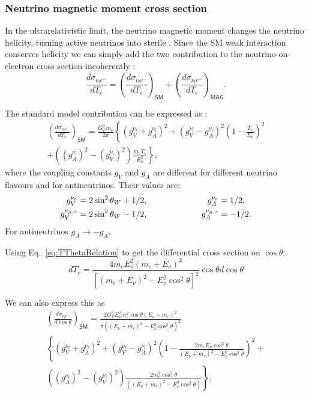 \subsubsection{Neutrino magnetic moment cross section}

In the ultrarelativistic limit, the neutrino magnetic moment changes the neutrino helicity, turning active neutrinos into sterile . Since the SM weak interaction conserves helicity we can simply add the two contribution to the neutrino-on-electron cross section incoherently \cite{nuElmagInt2015.pdf}:
\begin{equation}
\frac{d\sigma_{\nu_le^-}}{dT_e}=\left(\frac{d\sigma_{\nu_le^-}}{dT_e}\right)_{\textsf{SM}}+\left(\frac{d\sigma_{\nu_le^-}}{dT_e}\right)_{\textsf{MAG}}.
\end{equation}

The standard model contribution can be expressed as \cite{nuElmagInt2015.pdf}:
\begin{multline}
\left(\frac{d\sigma_{\nu_le^-}}{dT_e}\right)_{\textsf{SM}}=\frac{G_F^2m_e}{2\pi}\left\lbrace\left(g_V^{\nu_l}+g_A^{\nu_l}\right)^2+\left(g_V^{\nu_l}-g_A^{\nu_l}\right)^2\left(1-\frac{T_e}{E_{\nu}}\right)^2\right.\\
+\left.\left(\left(g_A^{\nu_l}\right)^2-\left(g_V^{\nu_l}\right)^2\right)\frac{m_eT_e}{E_{\nu}^2}\right\rbrace,
\end{multline}
where the coupling constants $g_V$ and $g_A$ are different for different neutrino flavours and for antineutrinos. Their values are:
\begin{align}
g_V^{\nu_e}&=2\sin^2\theta_W+1/2,\hspace{2.5cm} g_A^{\nu_e}=1/2,\\
g_V^{\nu_{\mu,\tau}}&=2\sin^2\theta_W-1/2,\hspace{2.25cm} g_A^{\nu_{\mu,\tau}}=-1/2.
\end{align}
For antineutrinos $g_A\rightarrow -g_A$.

Using Eq.~\ref{eq:TThetaRelation} to get the differential cross section on $\cos\theta$:
\begin{equation}
dT_e=\frac{4m_eE_\nu^2\left(m_e+E_\nu\right)^2}{\left[\left(m_e+E_\nu\right)^2-E_\nu^2\cos^2\theta\right]^2}\cos\theta d\cos\theta
\end{equation}

We can also express this as
\begin{multline}
\left(\frac{d\sigma_{\nu_le^-}}{d\cos\theta}\right)_{\textsf{SM}}=
\frac{2G_F^2E_{\nu}^2m_e^2\cos\theta\left(E_{\nu}+m_e\right)^2}{\pi\left(\left(E_{\nu}+m_e\right)^2-E_{\nu}^2\cos^2\theta\right)^2}\\
\left\lbrace\left(g_V^{\nu_l}+g_A^{\nu_l}\right)^2+
\left(g_V^{\nu_l}-g_A^{\nu_l}\right)^2\left(1-\frac{2m_eE_{\nu}\cos^2\theta}{\left(E_{\nu}+m_e\right)^2-E_{\nu}^2\cos^2\theta}\right)^2\right.+\\
\left.\left(\left(g_A^{\nu_l}\right)^2-\left(g_V^{\nu_l}\right)^2\right)
\frac{2m_e^2\cos^2\theta}{\left(\left(E_{\nu}+m_e\right)^2-E_{\nu}^2\cos^2\theta\right)}\right\rbrace,
\end{multline}

